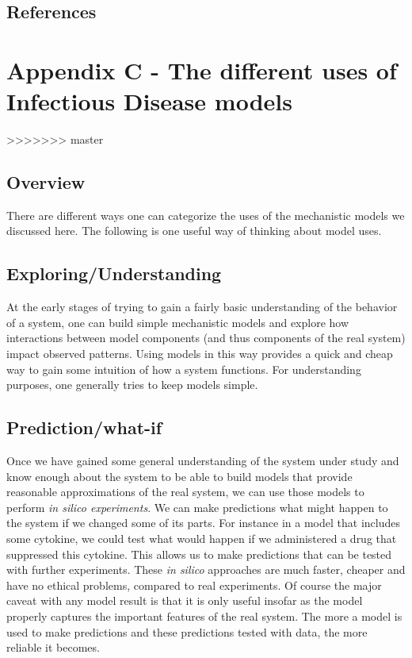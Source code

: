 \documentclass[]{book}
\theoremstyle{definition}
\theoremstyle{definition}
\theoremstyle{definition}
\theoremstyle{remark}
\begin{document}
\section{References}\label{references-20}

\chapter{Appendix C - The different uses of Infectious Disease
models}\label{appendix-c---the-different-uses-of-infectious-disease-models}
>>>>>>> master

\hypertarget{overview-1}{%
\section{Overview}\label{overview-1}}

There are different ways one can categorize the uses of the mechanistic
models we discussed here. The following is one useful way of thinking
about model uses.

\hypertarget{exploringunderstanding}{%
\section{Exploring/Understanding}\label{exploringunderstanding}}

At the early stages of trying to gain a fairly basic understanding of
the behavior of a system, one can build simple mechanistic models and
explore how interactions between model components (and thus components
of the real system) impact observed patterns. Using models in this way
provides a quick and cheap way to gain some intuition of how a system
functions. For understanding purposes, one generally tries to keep
models simple.

\hypertarget{predictionwhat-if}{%
\section{Prediction/what-if}\label{predictionwhat-if}}

Once we have gained some general understanding of the system under study
and know enough about the system to be able to build models that provide
reasonable approximations of the real system, we can use those models to
perform \emph{in silico experiments}. We can make predictions what might
happen to the system if we changed some of its parts. For instance in a
model that includes some cytokine, we could test what would happen if we
administered a drug that suppressed this cytokine. This allows us to
make predictions that can be tested with further experiments. These
\emph{in silico} approaches are much faster, cheaper and have no ethical
problems, compared to real experiments. Of course the major caveat with
any model result is that it is only useful insofar as the model properly
captures the important features of the real system. The more a model is
used to make predictions and these predictions tested with data, the
more reliable it becomes.
\end{document}
